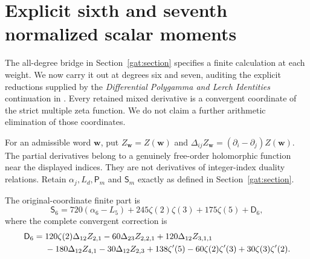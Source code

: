 
\section{Explicit sixth and seventh normalized scalar moments}
\label{hsm:section}

The all-degree bridge in Section~\ref{gat:section} specifies a finite
calculation at each weight.  We now carry it out at degrees six and
seven, auditing the explicit reductions supplied by the
\emph{Differential Polygamma and Lerch Identities} continuation in
\cite{dpm:reports}.  Every retained mixed derivative is a convergent
coordinate of the strict multiple zeta function.  We do not claim a
further arithmetic elimination of those coordinates.

For an admissible word $\mathbf w$, put
$Z_{\mathbf w}=Z(\mathbf w)$ and
$\Delta_{ij}Z_{\mathbf w}=(\partial_i-\partial_j)Z(\mathbf w)$.
The partial derivatives belong to a genuinely free-order holomorphic
function near the displayed indices.  They are not derivatives of
integer-index duality relations.  Retain $\alpha_j,L_d,\mathsf P_m$
and $\mathsf S_m$ exactly as defined in Section~\ref{gat:section}.

\begin{theorem}
\label{hsm:sixth}
The original-coordinate finite part is
\begin{equation}\label{hsm:sixth-main}
 \boxed{\mathsf S_6=720(\alpha_6-L_5)
          +245\zeta(2)\zeta(3)+175\zeta(5)+\mathsf D_6,}
\end{equation}
where the complete convergent correction is
\begin{align}\label{hsm:D6}
 \mathsf D_6={}&120\zeta(2)\Delta_{12}Z_{2,1}
       -60\Delta_{23}Z_{2,2,1}+120\Delta_{12}Z_{3,1,1}\notag\\
 &-180\Delta_{12}Z_{4,1}-30\Delta_{12}Z_{2,3}
       +138\zeta'(5)-60\zeta(2)\zeta'(3)+30\zeta(3)\zeta'(2).
\end{align}
\end{theorem}

